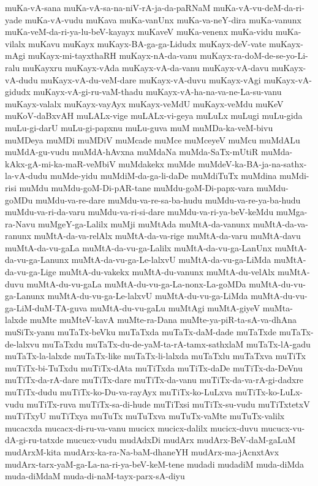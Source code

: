 {muKa-vA-sana
muKa-vA-sa-na-niV-rA-ja-da-paRNaM
muKa-vA-vu-deM-da-ri-yade
muKa-vA-vudu
muKava
muKa-vanUnx
muKa-va-neY-dira
muKa-vanunx
muKa-veM-da-ri-ya-lu-beV-kayayx
muKaveV
muKa-venenx
muKa-vidu
muKa-vilalx
muKavu
muKayx
muKayx-BA-ga-ga-Lidudx
muKayx-deV-vate
muKayx-mAgi
muKayx-mi-tayxthaRH
muKayx-nA-da-vanu
muKayx-ra-doM-de-se-yo-Li-ralu
muKayxru
muKayx-vAda
muKayx-vA-da-vanu
muKayx-vA-davu
muKayx-vA-dudu
muKayx-vA-du-veM-dare
muKayx-vA-duvu
muKayx-vAgi
muKayx-vA-gidudx
muKayx-vA-gi-ru-vaM-thadu
muKayx-vA-ha-na-va-ne-La-su-vanu
muKayx-valalx
muKayx-vayAyx
muKayx-veMdU
muKayx-veMdu
muKeV
muKoV-daBxvAH
muLALx-vige
muLALx-vi-geya
muLuLx
muLugi
muLu-gida
muLu-gi-darU
muLu-gi-papxnu
muLu-guva
muM
muMDa-ka-veM-bivu
muMDeya
muMDi
muMDiV
muMcade
muMce
muMceyeV
muMcu
muMdALu
muMdA-gu-vudu
muMdA-hAvxna
muMdaNa
muMda-SaTx-mUtiR
muMda-kAkx-gA-mi-ka-maR-veMbiV
muMdakekx
muMde
muMdeV-ka-BA-ja-na-sathx-la-vA-dudu
muMde-yidu
muMdiM-da-ga-li-daDe
muMdiTuTx
muMdina
muMdi-risi
muMdu
muMdu-goM-Di-pAR-tane
muMdu-goM-Di-papx-vara
muMdu-goMDu
muMdu-va-re-dare
muMdu-va-re-sa-ba-hudu
muMdu-va-re-ya-ba-hudu
muMdu-va-ri-da-varu
muMdu-va-ri-si-dare
muMdu-va-ri-ya-beV-keMdu
muMga-ra-Navu
muMgeY-ga-Lalilx
muMji
muMtAda
muMtA-da-vanunx
muMtA-da-va-ranunx
muMtA-da-va-relAlx
muMtA-da-va-rige
muMtA-da-varu
muMtA-davu
muMtA-da-vu-gaLa
muMtA-da-vu-ga-Lalilx
muMtA-da-vu-ga-LanUnx
muMtA-da-vu-ga-Lanunx
muMtA-da-vu-ga-Le-lalxvU
muMtA-da-vu-ga-LiMda
muMtA-da-vu-ga-Lige
muMtA-du-vakekx
muMtA-du-vanunx
muMtA-du-velAlx
muMtA-duvu
muMtA-du-vu-gaLa
muMtA-du-vu-ga-La-nonx-La-goMDa
muMtA-du-vu-ga-Lanunx
muMtA-du-vu-ga-Le-lalxvU
muMtA-du-vu-ga-LiMda
muMtA-du-vu-ga-LiM-duM-TA-guva
muMtA-du-vu-gaLu
muMtAgi
muMtA-giyeV
muMta-lalxde
muMte
muMteV-kavA
muMte-ra-Dana
muMte-ya-piR-ta-sA-va-dhAna
muSiTx-yanu
muTaTx-beVku
muTaTxda
muTaTx-daM-dade
muTaTxde
muTaTx-de-lalxvu
muTaTxdu
muTaTx-du-de-yaM-ta-rA-tamx-sathxlaM
muTaTx-lA-gadu
muTaTx-la-lalxde
muTaTx-like
muTaTx-li-lalxda
muTaTxlu
muTaTxva
muTiTx
muTiTx-bi-TuTxdu
muTiTx-dAta
muTiTxda
muTiTx-daDe
muTiTx-da-DeVnu
muTiTx-da-rA-dare
muTiTx-dare
muTiTx-da-vanu
muTiTx-da-va-rA-gi-dadxre
muTiTx-dudu
muTiTx-ko-Du-va-rayAyx
muTiTx-ko-LuLxva
muTiTx-ko-LuLx-vudu
muTiTx-ruva
muTiTx-sa-di-hude
muTiTxsi
muTiTx-su-vudu
muTiTxtetxV
muTiTxyU
muTiTxya
muTuTx
muTuTxva
muTuTx-vaMte
muTuTx-valilx
mucacxda
mucacx-di-ru-va-vanu
mucicx
mucicx-dalilx
mucicx-duvu
mucucx-vu-dA-gi-ru-tatxde
mucucx-vudu
mudAdxDi
mudArx
mudArx-BeV-daM-gaLuM
mudArxM-kita
mudArx-ka-ra-Na-baM-dhaneYH
mudArx-ma-jAcnxtAvx
mudArx-tarx-yaM-ga-La-na-ri-ya-beV-keM-tene
mudadi
mudadiM
muda-diMda
muda-diMdaM
muda-di-naM-tayx-parx-sA-diyu
}
